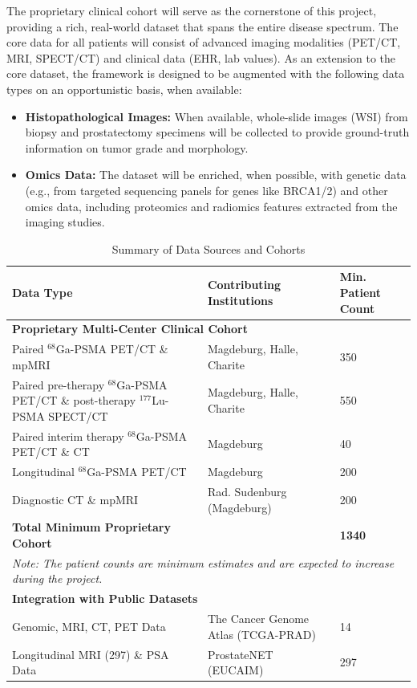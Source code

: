 \documentclass[11pt, a4paper]{article}
\begin{document}
The proprietary clinical cohort will serve as the cornerstone of this project, providing a rich, real-world dataset that spans the entire disease spectrum. The core data for all patients will consist of advanced imaging modalities (PET/CT, MRI, SPECT/CT) and clinical data (EHR, lab values). As an extension to the core dataset, the framework is designed to be augmented with the following data types on an opportunistic basis, when available:
\begin{itemize}
    \item \textbf{Histopathological Images:} When available, whole-slide images (WSI) from biopsy and prostatectomy specimens will be collected to provide ground-truth information on tumor grade and morphology.
    \item \textbf{Omics Data:} The dataset will be enriched, when possible, with genetic data (e.g., from targeted sequencing panels for genes like BRCA1/2) and other omics data, including proteomics and radiomics features extracted from the imaging studies.
\end{itemize}

\begin{table}[H]
\centering
\caption{Summary of Data Sources and Cohorts}
\label{tab:data}
\begin{tabular}{p{} p{} p{}}
\toprule
\textbf{Data Type} & \textbf{Contributing Institutions} & \textbf{Min. Patient Count} \\
\midrule
\multicolumn{3}{l}{\textbf{Proprietary Multi-Center Clinical Cohort}} \\
\midrule
Paired $^{68}$Ga-PSMA PET/CT \& mpMRI & Magdeburg, Halle, Charite & 350 \\
\cmidrule(lr){1-3}
Paired pre-therapy $^{68}$Ga-PSMA PET/CT \& post-therapy $^{177}$Lu-PSMA SPECT/CT & Magdeburg, Halle, Charite & 550 \\
\cmidrule(lr){1-3}
Paired interim therapy $^{68}$Ga-PSMA PET/CT \& CT & Magdeburg & 40 \\
\cmidrule(lr){1-3}
Longitudinal $^{68}$Ga-PSMA PET/CT & Magdeburg & 200 \\
\cmidrule(lr){1-3}
Diagnostic CT \& mpMRI & Rad. Sudenburg (Magdeburg) & 200 \\
\midrule
\textbf{Total Minimum Proprietary Cohort} & & \textbf{1340} \\
\midrule
\multicolumn{3}{p{\dimexpr\linewidth-2\tabcolsep}}{\small\textit{Note: The patient counts are minimum estimates and are expected to increase during the project.}} \\
\midrule
\multicolumn{3}{l}{\textbf{Integration with Public Datasets}} \\
\midrule
Genomic, MRI, CT, PET Data & The Cancer Genome Atlas (TCGA-PRAD) \cite{zuley2016cancer} & 14 \\
\cmidrule(lr){1-3}
Longitudinal MRI (297) \& PSA Data & ProstateNET (EUCAIM) \cite{prostateNetArchive} & 297 \\
\bottomrule
\end{tabular}
\end{table}
\end{document}
